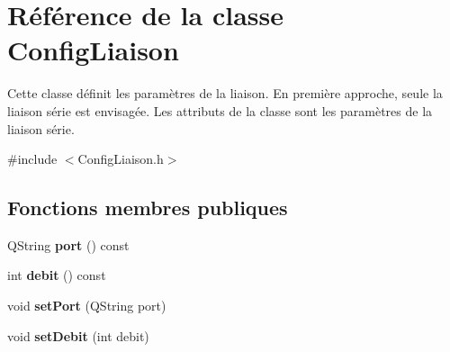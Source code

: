 \hypertarget{class_config_liaison}{}\section{Référence de la classe Config\+Liaison}
\label{class_config_liaison}


Cette classe définit les paramètres de la liaison. En première approche, seule la liaison série est envisagée. Les attributs de la classe sont les paramètres de la liaison série.  




{\ttfamily \#include $<$Config\+Liaison.\+h$>$}

\subsection*{Fonctions membres publiques}
\begin{DoxyCompactItemize}
\item 
Q\+String {\bfseries port} () const \hypertarget{class_config_liaison_ae1fd90dc7c1003f0d0515435f32cac7b}{}\label{class_config_liaison_ae1fd90dc7c1003f0d0515435f32cac7b}

\item 
int {\bfseries debit} () const \hypertarget{class_config_liaison_a7966350b65217586e89460eb3c7f74d6}{}\label{class_config_liaison_a7966350b65217586e89460eb3c7f74d6}

\item 
void {\bfseries set\+Port} (Q\+String port)\hypertarget{class_config_liaison_a76ff36009aac38bd0bb4b72de76e34c9}{}\label{class_config_liaison_a76ff36009aac38bd0bb4b72de76e34c9}

\item 
void {\bfseries set\+Debit} (int debit)\hypertarget{class_config_liaison_a9859103f842682698d2a5660807514fc}{}\label{class_config_liaison_a9859103f842682698d2a5660807514fc}

\end{DoxyCompactItemize}
